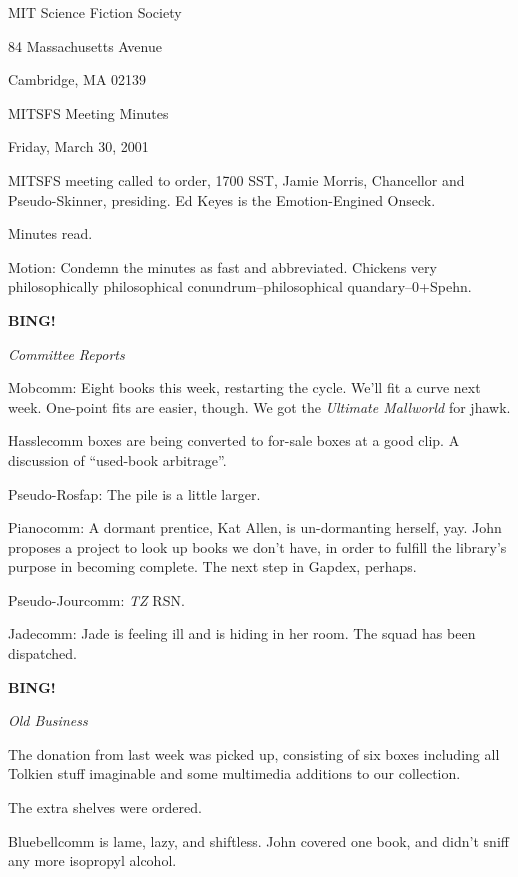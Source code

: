 \documentclass[12pt]{article}
\newcommand{\bing}{{\bf BING!} }
\newcommand{\goto}[1]{\bing \vskip 12pt \centerline{{\em{#1}}}}
\begin{document}
\begin{center}

MIT Science Fiction Society 

84 Massachusetts Avenue

Cambridge, MA 02139

\vspace{12pt}

MITSFS Meeting Minutes 

Friday, March 30, 2001

\end{center}
 
\vspace{18pt}

\setlength{\parskip}{6pt}

\noindent
MITSFS meeting called to order, 1700 SST, Jamie Morris, Chancellor and
Pseudo-Skinner, presiding.  Ed Keyes is the Emotion-Engined Onseck.

Minutes read.

Motion: Condemn the minutes as fast and abbreviated.  Chickens very
philosophically philosophical conundrum--philosophical quandary--0+Spehn.

\goto{Committee Reports}

Mobcomm: Eight books this week, restarting the cycle.  We'll fit a curve
next week.  One-point fits are easier, though.  We got the {\em Ultimate
Mallworld} for jhawk.

Hasslecomm boxes are being converted to for-sale boxes at a good clip.
A discussion of ``used-book arbitrage''.

Pseudo-Rosfap: The pile is a little larger.

Pianocomm: A dormant prentice, Kat Allen, is un-dormanting herself,
yay.  John proposes a project to look up books we don't have, in order
to fulfill the library's purpose in becoming complete.  The next step
in Gapdex, perhaps.

Pseudo-Jourcomm: {\em TZ} RSN.

Jadecomm: Jade is feeling ill and is hiding in her room.  The squad
has been dispatched.

\goto{Old Business}

The donation from last week was picked up, consisting of six boxes
including all Tolkien stuff imaginable and some multimedia additions
to our collection.

The extra shelves were ordered.

Bluebellcomm is lame, lazy, and shiftless.  John covered one book, and
didn't sniff any more isopropyl alcohol.
\end{document}
